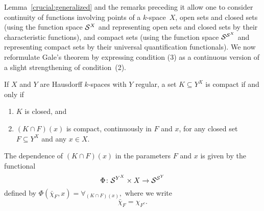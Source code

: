 \documentclass{LMCS}
\begin{document}
Lemma~\ref{crucial:generalized} and the remarks preceding it allow one
to consider continuity of functions involving points of a
$k$-space~$X$, open sets and closed sets (using the function space
$\mathcal{S}^X$ and representing open sets and closed sets by their
characteristic functions), and compact sets (using the function space
$\mathcal{S}^{\mathcal{S}^X}$ and representing compact sets by their universal
quantification functionals). We now reformulate Gale's theorem by
expressing condition (3) as a continuous version of a slight
strengthening of condition~(2). 
\begin{thm} \label{gale:modified}
  If $X$ and $Y$ are Hausdorff $k$-spaces with $Y$ regular, a set $K \subseteq
  Y^X$ is compact if and only if
  \begin{enumerate}
  \item $K$ is closed, and
  \item $(K \cap F)(x)$ is compact, continuously in $F$ and $x$,
    for any closed set $F \subseteq Y^X$ and any $x \in X$.
  \end{enumerate}
\end{thm}
\noindent The dependence of $(K \cap F)(x)$ in the parameters $F$ and $x$ is
given by the functional
\[
\Phi \colon \mathcal{S}^{Y^X} \times X \to \mathcal{S}^{\mathcal{S}^Y}
\]
defined by
$\Phi(\bar{\chi}_F,x) = \forall_{(K\cap F)(x)},$
where we write
\[
\bar{\chi}_F = \chi_{F^c}.
\]
\end{document}
